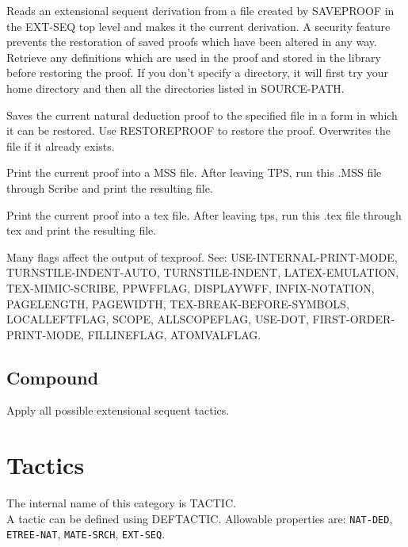 \begin{description} 
\item[RESTOREPROOF]  
Reads an extensional sequent derivation from a file created
by SAVEPROOF in the EXT-SEQ top level and makes it the current
derivation.  A security feature prevents the restoration of saved
proofs which have been altered in any way.  Retrieve any definitions
which are used in the proof and stored in the library before restoring
the proof. If you don't specify a directory, it will first try your
home directory and then all the directories listed in SOURCE-PATH.

\item[SAVEPROOF]  
Saves the current natural deduction proof to the specified file in
a form in which it can be restored.  Use RESTOREPROOF to restore the proof.
Overwrites the file if it already exists.

\item[SCRIBEPROOF]  
Print the current proof into a MSS file.
After leaving TPS, run this .MSS file through Scribe and print the resulting
file.

\item[TEXPROOF]  
Print the current proof into a tex file.
After leaving tps, run this .tex file through tex and print the resulting
file.

Many flags affect the output of texproof.
See: USE-INTERNAL-PRINT-MODE, TURNSTILE-INDENT-AUTO, TURNSTILE-INDENT,
LATEX-EMULATION, TEX-MIMIC-SCRIBE, PPWFFLAG, DISPLAYWFF, INFIX-NOTATION,
PAGELENGTH, PAGEWIDTH, TEX-BREAK-BEFORE-SYMBOLS, LOCALLEFTFLAG, SCOPE,
ALLSCOPEFLAG, USE-DOT, FIRST-ORDER-PRINT-MODE, FILLINEFLAG, ATOMVALFLAG.
\item
\end{description}

\section{Compound}

\begin{description} 
\item[GO2]  
Apply all possible extensional sequent tactics.
\item
\end{description}
\chapter{Tactics}
The internal name of this category is 
TACTIC.\\
A tactic can be defined using DEFTACTIC.
Allowable properties are: \texttt{NAT-DED}, \texttt{ETREE-NAT}, \texttt{MATE-SRCH}, \texttt{EXT-SEQ}.

